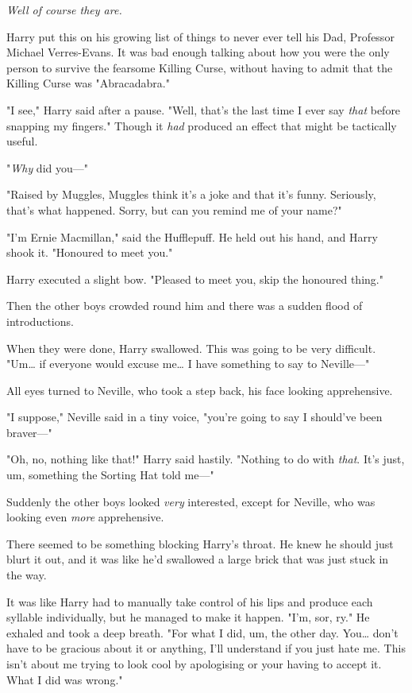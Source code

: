 \emph{Well of course they are.}

Harry put this on his growing list of things to never ever tell his Dad, 
Professor Michael Verres-Evans. It was bad enough talking about how you were 
the only person to survive the fearsome Killing Curse, without having to admit 
that the Killing Curse was "Abracadabra."

"I see," Harry said after a pause. "Well, that's the last time I ever say 
\emph{that} before snapping my fingers." Though it \emph{had} produced an 
effect that might be tactically useful.

"\emph{Why} did you---"

"Raised by Muggles, Muggles think it's a joke and that it's funny. Seriously, 
that's what happened. Sorry, but can you remind me of your name?"

"I'm Ernie Macmillan," said the Hufflepuff. He held out his hand, and Harry 
shook it. "Honoured to meet you."

Harry executed a slight bow. "Pleased to meet you, skip the honoured thing."

Then the other boys crowded round him and there was a sudden flood of 
introductions.

When they were done, Harry swallowed. This was going to be very difficult. 
"Um{\ldots} if everyone would excuse me{\ldots} I have something to say to 
Neville---"

All eyes turned to Neville, who took a step back, his face looking apprehensive.

"I suppose," Neville said in a tiny voice, "you're going to say I should've 
been braver---"

"Oh, no, nothing like that!" Harry said hastily. "Nothing to do with 
\emph{that}. It's just, um, something the Sorting Hat told me---"

Suddenly the other boys looked \emph{very} interested, except for Neville, who 
was looking even \emph{more} apprehensive.

There seemed to be something blocking Harry's throat. He knew he should just 
blurt it out, and it was like he'd swallowed a large brick that was just stuck 
in the way.

It was like Harry had to manually take control of his lips and produce each 
syllable individually, but he managed to make it happen. "I'm, sor, ry." He 
exhaled and took a deep breath. "For what I did, um, the other day. You{\ldots} 
don't have to be gracious about it or anything, I'll understand if you just 
hate me. This isn't about me trying to look cool by apologising or your having 
to accept it. What I did was wrong."

